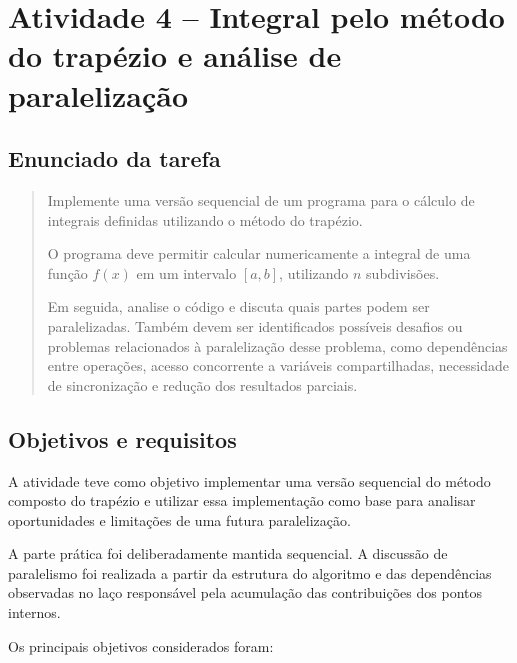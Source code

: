 \chapter{Atividade 4 -- Integral pelo método do trapézio e análise de paralelização}

\label{chap:atvd04}

\section{Enunciado da tarefa}

\label{sec:atvd04-enunciado}

\begin{quote}

Implemente uma versão sequencial de um programa para o cálculo de integrais
definidas utilizando o método do trapézio.

O programa deve permitir calcular numericamente a integral de uma função
\(f(x)\) em um intervalo \([a,b]\), utilizando \(n\) subdivisões.

Em seguida, analise o código e discuta quais partes podem ser paralelizadas.
Também devem ser identificados possíveis desafios ou problemas relacionados
à paralelização desse problema, como dependências entre operações, acesso
concorrente a variáveis compartilhadas, necessidade de sincronização e
redução dos resultados parciais.

\end{quote}


\section{Objetivos e requisitos}

\label{sec:atvd04-objetivos}

A atividade teve como objetivo implementar uma versão sequencial do método
composto do trapézio e utilizar essa implementação como base para analisar
oportunidades e limitações de uma futura paralelização.

A parte prática foi deliberadamente mantida sequencial. A discussão de
paralelismo foi realizada a partir da estrutura do algoritmo e das
dependências observadas no laço responsável pela acumulação das contribuições
dos pontos internos.

Os principais objetivos considerados foram:

